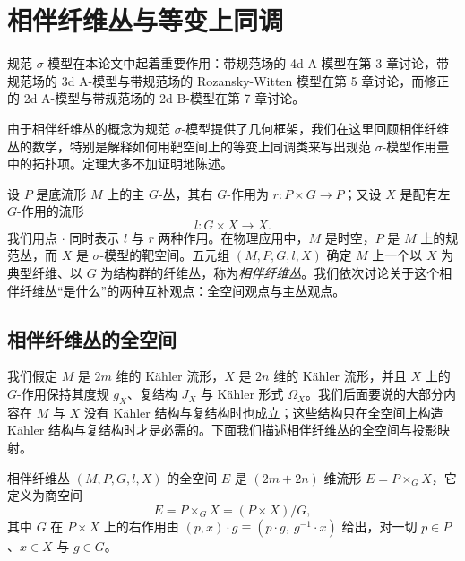 
\chapter{相伴纤维丛与等变上同调}

规范 $\sigma$-模型在本论文中起着重要作用：带规范场的 4d A-模型在第 3 章讨论，带规范场的 3d A-模型与带规范场的 Rozansky-Witten 模型在第 5 章讨论，而修正的 2d A-模型与带规范场的 2d B-模型在第 7 章讨论。

由于相伴纤维丛的概念为规范 $\sigma$-模型提供了几何框架，我们在这里回顾相伴纤维丛的数学，特别是解释如何用靶空间上的等变上同调类来写出规范 $\sigma$-模型作用量中的拓扑项。定理大多不加证明地陈述。


设 $P$ 是底流形 $M$ 上的主 $G$-丛，其右 $G$-作用为 $r: P\times G\to P$；又设 $X$ 是配有左 $G$-作用的流形
\[ l: G\times X\to X. \]
我们用点 $\cdot$ 同时表示 $l$ 与 $r$ 两种作用。在物理应用中，$M$ 是时空，$P$ 是 $M$ 上的规范丛，而 $X$ 是 $\sigma$-模型的靶空间。五元组 $(M,P,G,l,X)$ 确定 $M$ 上一个以 $X$ 为典型纤维、以 $G$ 为结构群的纤维丛，称为\emph{相伴纤维丛}。我们依次讨论关于这个相伴纤维丛“是什么”的两种互补观点：全空间观点与主丛观点。

\section{相伴纤维丛的全空间}

我们假定 $M$ 是 $2m$ 维的 Kähler 流形，$X$ 是 $2n$ 维的 Kähler 流形，并且 $X$ 上的 $G$-作用保持其度规 $g_X$、复结构 $J_X$ 与 Kähler 形式 $\Omega_X$。我们后面要说的大部分内容在 $M$ 与 $X$ 没有 Kähler 结构与复结构时也成立；这些结构只在全空间上构造 Kähler 结构与复结构时才是必需的。下面我们描述相伴纤维丛的全空间与投影映射。

\begin{definition}
相伴纤维丛 $(M,P,G,l,X)$ 的全空间 $E$ 是 $(2m+2n)$ 维流形 $E=P\times_G X$，它定义为商空间
\[ E = P\times_G X = (P\times X)/G, \]
其中 $G$ 在 $P\times X$ 上的右作用由 $(p,x)\cdot g\equiv(p\cdot g,\ g^{-1}\cdot x)$ 给出，对一切 $p\in P$、$x\in X$ 与 $g\in G$。
\end{definition}

